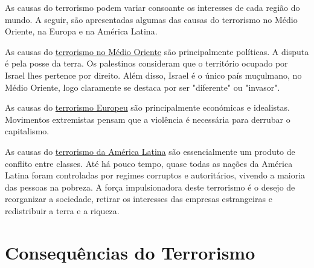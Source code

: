\documentclass{report}
\begin{document}
As causas do terrorismo podem variar consoante os interesses de cada região do mundo. A seguir, são apresentadas algumas das causas do terrorismo no Médio Oriente, na Europa e na América Latina.\par
As causas do \underline{terrorismo no Médio Oriente} são principalmente políticas. A disputa é pela posse da terra. Os palestinos consideram que o território ocupado por Israel lhes pertence por  direito. Além disso, Israel é o único país muçulmano, no Médio Oriente, logo claramente se destaca por ser "diferente" ou "invasor".\par
As causas do \underline{terrorismo Europeu} são principalmente económicas e idealistas. Movimentos extremistas pensam que a violência é necessária para derrubar o capitalismo.\par
As causas do \underline{terrorismo da América Latina} são essencialmente um produto de conflito entre classes. Até há pouco tempo, quase todas as nações da América Latina foram controladas por regimes corruptos e autoritários, vivendo a maioria das pessoas na pobreza. A força impulsionadora deste terrorismo é o desejo  de reorganizar a sociedade, retirar os interesses das empresas estrangeiras e redistribuir a terra e a riqueza. 



\chapter{Consequências do Terrorismo}
\label{chap.Consequências do Terrorismo}
\end{document}
